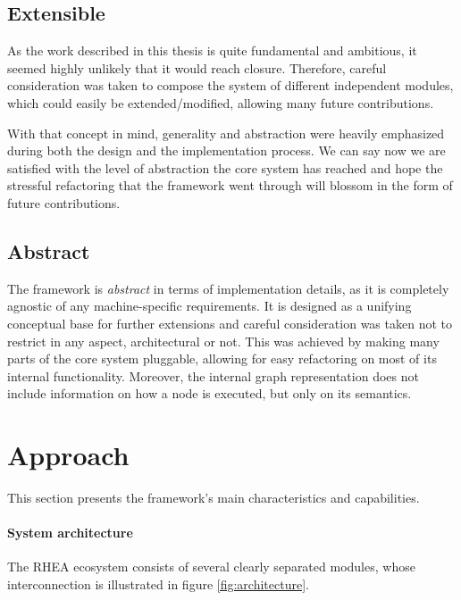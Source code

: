 \documentclass[sigplan,review,anonymous]{acmart}
\begin{document}

\subsection{Extensible}

As the work described in this thesis is quite fundamental and ambitious, it
seemed highly unlikely that it would reach closure. Therefore, careful
consideration was taken to compose the system of different independent modules,
which could easily be extended/modified, allowing many future contributions.

With that concept in mind, generality and abstraction were heavily emphasized
during both the design and the implementation process. We can say now we are
satisfied with the level of abstraction the core system has reached and hope the
stressful refactoring that the framework went through will blossom in the form
of future contributions.

\subsection{Abstract}

The framework is \textit{abstract} in terms of implementation details, as it is
completely agnostic of any machine-specific requirements. It is designed as a
unifying conceptual base for further extensions and careful consideration was
taken not to restrict in any aspect, architectural or not. This was achieved by
making many parts of the core system pluggable, allowing for easy refactoring on
most of its internal functionality. Moreover, the internal graph representation
does not include information on how a node is executed, but only on its
semantics.

\section{Approach} \label{sec:approach}

This section presents the framework's main characteristics and capabilities.

\paragraph{System architecture}
The \textsc{RHEA} ecosystem consists of several
clearly separated modules, whose interconnection is illustrated in figure
\ref{fig:architecture}.

\end{document}
